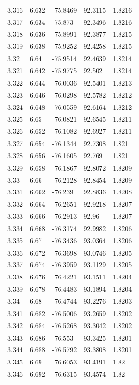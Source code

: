 \begin{tabular}{lllll}
3.316 & 6.632 & -75.8469 & 92.3115 & 1.8216 \\
3.317 & 6.634 & -75.873 & 92.3496 & 1.8216 \\
3.318 & 6.636 & -75.8991 & 92.3877 & 1.8215 \\
3.319 & 6.638 & -75.9252 & 92.4258 & 1.8215 \\
3.32 & 6.64 & -75.9514 & 92.4639 & 1.8214 \\
3.321 & 6.642 & -75.9775 & 92.502 & 1.8214 \\
3.322 & 6.644 & -76.0036 & 92.5401 & 1.8213 \\
3.323 & 6.646 & -76.0298 & 92.5782 & 1.8212 \\
3.324 & 6.648 & -76.0559 & 92.6164 & 1.8212 \\
3.325 & 6.65 & -76.0821 & 92.6545 & 1.8211 \\
3.326 & 6.652 & -76.1082 & 92.6927 & 1.8211 \\
3.327 & 6.654 & -76.1344 & 92.7308 & 1.821 \\
3.328 & 6.656 & -76.1605 & 92.769 & 1.821 \\
3.329 & 6.658 & -76.1867 & 92.8072 & 1.8209 \\
3.33 & 6.66 & -76.2128 & 92.8454 & 1.8209 \\
3.331 & 6.662 & -76.239 & 92.8836 & 1.8208 \\
3.332 & 6.664 & -76.2651 & 92.9218 & 1.8207 \\
3.333 & 6.666 & -76.2913 & 92.96 & 1.8207 \\
3.334 & 6.668 & -76.3174 & 92.9982 & 1.8206 \\
3.335 & 6.67 & -76.3436 & 93.0364 & 1.8206 \\
3.336 & 6.672 & -76.3698 & 93.0746 & 1.8205 \\
3.337 & 6.674 & -76.3959 & 93.1129 & 1.8205 \\
3.338 & 6.676 & -76.4221 & 93.1511 & 1.8204 \\
3.339 & 6.678 & -76.4483 & 93.1894 & 1.8204 \\
3.34 & 6.68 & -76.4744 & 93.2276 & 1.8203 \\
3.341 & 6.682 & -76.5006 & 93.2659 & 1.8202 \\
3.342 & 6.684 & -76.5268 & 93.3042 & 1.8202 \\
3.343 & 6.686 & -76.553 & 93.3425 & 1.8201 \\
3.344 & 6.688 & -76.5792 & 93.3808 & 1.8201 \\
3.345 & 6.69 & -76.6053 & 93.4191 & 1.82 \\
3.346 & 6.692 & -76.6315 & 93.4574 & 1.82 \\

\end{tabular}
